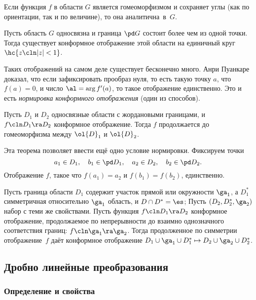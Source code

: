 \documentclass[a4paper]{article}
\begin{document}
\begin{theorem}[Д.\,Е.\,Меньшов, 19231926 г.]
Если функция $f$ в области $G$ является гомеоморфизмом и сохраняет углы (как по ориентации, так и по величине), то
она аналитична~в~$G$.
\end{theorem}

\begin{theorem}[Б.\,Риман]
Пусть область $G$ односвязна и граница $\pd G$ состоит более чем из одной точки. Тогда существует конформное
отображение этой области на единичный круг $\hc{z\cln |z|<1}$.
\end{theorem}

Таких отображений на самом деле существует бесконечно много. Анри Пуанкаре доказал, что если зафиксировать
прообраз нуля, то есть такую точку $a$, что $f(a)=0$, и число $\al = \arg f'(a)$, то такое отображение единственно.
Это и есть \emph{нормировка конформного отображения} (один из способов).

\begin{theorem}[Каратеодори]
Пусть $D_1$ и $D_2$ односвязные области с жордановыми границами, и
$f\cln D_1\ra D_2$ конформное отображение. Тогда $f$ продолжается до гомеоморфизма между $\ol{D}_1$ и $\ol{D}_2$.
\end{theorem}

Эта теорема позволяет ввести ещё одно условие нормировки. Фиксируем точки
$$a_1\in D_1, \quad b_1\in\pd D_1, \quad a_2\in D_2, \quad b_2\in \pd D_2.$$
Отображение $f$, такое что $f(a_1)=a_2$ и $f(b_1)=f(b_2)$, единственно.

\begin{theorem}
Пусть граница области $D_1$ содержит участок прямой или окружности $\ga_1$, а $D_1^*$
симметричная относительно $\ga_1$ область, и $D \cap D^*=\es$;
Пусть $(D_2, D_2^*,\ga_2)$ набор с теми же свойствами. Пусть функция $f\cln D_1\ra D_2$ конформное
отображение, продолжаемое по непрерывности до взаимно однозначного соответствия границ: $f\cln \ga_1 \ra \ga_2$.
Тогда продолженное по симметрии отображение~$f$ даёт конформное отображение
$D_1\cup\ga_1\cup D_1^* \mapsto D_2\cup\ga_2\cup D_2^*$.
\end{theorem}

\subsection{Дробно линейные преобразования}

\subsubsection{Определение и свойства}
\end{document}
